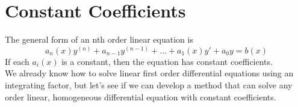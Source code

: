 \section{Constant Coefficients}
The general form of an nth order linear equation is
\begin{equation*}
	a_n(x)y^{(n)} + a_{n-1}y^{(n-1)} + \ldots + a_1(x)y' + a_0y = b(x)
\end{equation*}
If each $a_i(x)$ is a constant, then the equation has constant coefficients.\\

\noindent
We already know how to solve linear first order differential equations using an integrating factor, but let's see if we can develop a method that can solve any order linear, homogeneous differential equation with constant coefficients.



